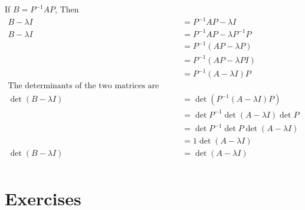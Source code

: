 \documentclass[12pt letter]{report}
\begin{document}
\begin{myproof}
  If $B = P^{-1}AP$, Then
  \begin{align*}
    B - \lambda I                     & = P^{-1}AP  - \lambda I                                      \\
    B - \lambda I                     & = P^{-1}AP - \lambda P^{-1}P                                 \\
                                      & = P^{-1} \left( AP - \lambda P \right)                       \\
                                      & = P^{-1} \left( AP - \lambda PI \right)                      \\
                                      & = P^{-1} \left( A - \lambda I \right)P                       \\
    \text{The determinants of the two matrices are equal, then:}                                     \\
    \det \left( B - \lambda I \right) & = \det \left( P^{-1} \left( A - \lambda I \right) P  \right) \\
                                      & = \det P^{-1} \det \left( A - \lambda I \right) \det P       \\
                                      & = \det P^{-1} \det P \det \left( A - \lambda I \right)       \\
                                      & = 1 \det \left( A - \lambda I \right)                        \\
    \det \left( B - \lambda I \right) & = \det \left( A - \lambda I \right)                          \\
  \end{align*}
\end{myproof}


\section{Exercises}

\end{document}
